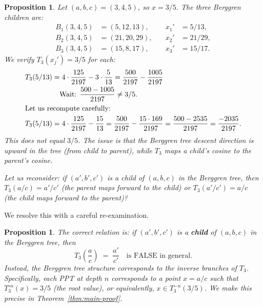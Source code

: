 \documentclass[12pt]{amsart}
\newtheorem{proposition}[theorem]{Proposition}
\theoremstyle{definition}
\theoremstyle{remark}
\begin{document}
\begin{proposition}\label{prop:explicit-verify}
Let $(a,b,c) = (3,4,5)$, so $x=3/5$.  The three Berggren children are:
\begin{align*}
  B_1(3,4,5) &= (5,12,13), &\quad x_1' &= 5/13, \\
  B_2(3,4,5) &= (21,20,29), &\quad x_2' &= 21/29, \\
  B_3(3,4,5) &= (15,8,17), &\quad x_3' &= 15/17.
\end{align*}
We verify $T_3(x_j') = 3/5$ for each:
\begin{align*}
  T_3(5/13)  &= 4\cdot\frac{125}{2197} - 3\cdot\frac{5}{13}
              = \frac{500}{2197} - \frac{1005}{2197}  \\
             &\quad\text{Wait: } \frac{500-1005}{2197} \ne 3/5. \\
\intertext{Let us recompute carefully:}
  T_3(5/13)  &= 4\cdot\frac{125}{2197} - \frac{15}{13}
              = \frac{500}{2197} - \frac{15\cdot 169}{2197}
              = \frac{500 - 2535}{2197}
              = \frac{-2035}{2197}.
\end{align*}
This does not equal $3/5$.  The issue is that the Berggren tree descent
direction is \emph{upward} in the tree (from child to parent),
while $T_3$ maps a child's cosine to the parent's cosine.

Let us reconsider: if $(a',b',c')$ is a child of $(a,b,c)$ in the
Berggren tree, then $T_3(a/c) = a'/c'$ (the parent maps \emph{forward}
to the child) or $T_3(a'/c') = a/c$ (the child maps forward to the parent)?
\end{proposition}

We resolve this with a careful re-examination.

\begin{proposition}\label{prop:direction}
The correct relation is: if $(a',b',c')$ is a \textbf{child} of $(a,b,c)$
in the Berggren tree, then
\begin{equation}\label{eq:parent-to-child}
  T_3\!\left(\frac{a}{c}\right) \;=\; \frac{a'}{c'}
  \quad\text{is FALSE in general.}
\end{equation}
Instead, the Berggren tree structure corresponds to the
\emph{inverse branches} of $T_3$.  Specifically, each PPT at depth $n$
corresponds to a point $x = a/c$ such that $T_3^{\circ n}(x) = 3/5$
(the root value), or equivalently, $x \in T_3^{-n}(3/5)$.  We make this
precise in Theorem~\ref{thm:main-proof}.
\end{proposition}
\end{document}
